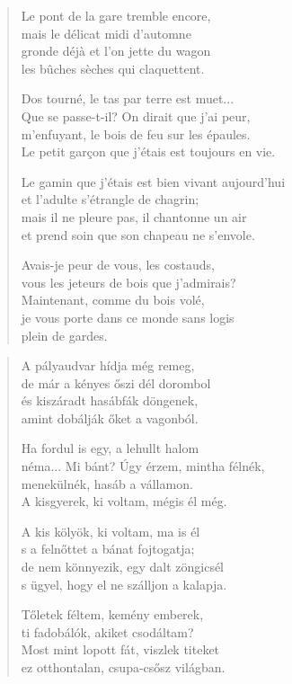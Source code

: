 \documentclass[11pt]{book}
\newcommand*{\centeredornament}{\centerline{\pgfornament[width=6cm]{88}}}
\begin{document}
\begin{verse}
  Le pont de la gare tremble encore, \\
  mais le délicat midi d'automne \\
  gronde déjà et l'on jette du wagon \\
  les bûches sèches qui claquettent.

  Dos tourné, le tas par terre est muet... \\
  Que se passe-t-il? On dirait que j'ai peur, \\
  m'enfuyant, le bois de feu sur les épaules. \\
  Le petit garçon que j'étais est toujours en vie.

  Le gamin que j'étais est bien vivant aujourd'hui \\
  et l'adulte s'étrangle de chagrin; \\
  mais il ne pleure pas, il chantonne un air \\
  et prend soin que son chapeau ne s'envole.

  Avais-je peur de vous, les costauds, \\
  vous les jeteurs de bois que j'admirais? \\
  Maintenant, comme du bois volé, \\
  je vous porte dans ce monde sans logis \\
  plein de gardes.
\end{verse}

\newpage

\vspace*{-15mm}
\centeredornament



\begin{verse}
  A pályaudvar hídja még remeg, \\
  de már a kényes őszi dél dorombol \\
  és kiszáradt hasábfák döngenek, \\
  amint dobálják őket a vagonból.

  Ha fordul is egy, a lehullt halom \\
  néma... Mi bánt? Úgy érzem, mintha félnék, \\
  menekülnék, hasáb a vállamon. \\
  A kisgyerek, ki voltam, mégis él még.

  A kis kölyök, ki voltam, ma is él \\
  s a felnőttet a bánat fojtogatja; \\
  de nem könnyezik, egy dalt zöngicsél \\
  s ügyel, hogy el ne szálljon a kalapja.

  Tőletek féltem, kemény emberek, \\
  ti fadobálók, akiket csodáltam? \\
  Most mint lopott fát, viszlek titeket \\
  ez otthontalan, csupa-csősz világban.
\end{verse}
\end{document}
